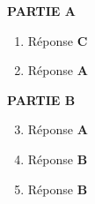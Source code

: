 
\medskip

\textbf{PARTIE A}
\begin{enumerate}[itemsep=1em]
    \item Réponse \textbf{C}
    \item Réponse \textbf{A}
\end{enumerate}

\textbf{PARTIE B}

\begin{enumerate}[itemsep=1em]
\setcounter{enumi}{2}
    \item Réponse \textbf{A}
    \item Réponse \textbf{B}
    \item Réponse \textbf{B}
\end{enumerate}
\medskip

